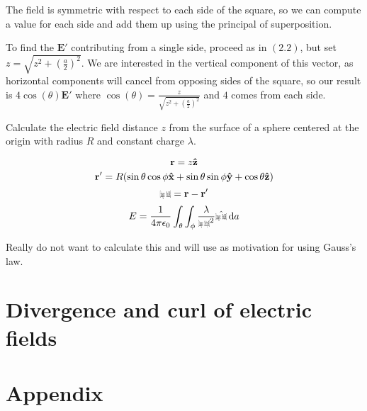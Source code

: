 \documentclass[10pt]{article}
\def\rcurs{{\mbox{$\resizebox{.16in}{.08in}{\texttt{[image: ScriptR]}}$}}}
\def\brcurs{{\mbox{$\resizebox{.16in}{.08in}{\texttt{[image: BoldR]}}$}}}
\def\hrcurs{{\mbox{$\hat \brcurs$}}}
\newcommand{\uvec}[1]{\boldsymbol{\hat{\textbf{#1}}}}
\begin{document}
\begin{solution}[2.4]

The field is symmetric with respect to each side of the square, so we can compute a value for each side and add them up using the principal of superposition.

To find the $\boldsymbol{E}'$ contributing from a single side, proceed as in $(2.2)$, but set $z = \sqrt{z^2 + (\frac a2)^2}$. We are interested in the vertical component of this vector, as horizontal components will cancel from opposing sides of the square, so our result is $4\cos(\theta)\boldsymbol{E}'$ where $\cos(\theta) = \frac{z}{\sqrt{z^2 + (\frac a2)^2}}$ and $4$ comes from each side.

\end{solution}

\begin{exercise}[2.7]
	Calculate the electric field distance $z$ from the surface of a sphere
	centered at the origin with radius $R$ and constant charge $\lambda$.
\end{exercise}

\begin{solution}
	\[ \bold{r} =  z\uvec{z}\]
	\[ \bold{r'} = R(\sin\theta\cos\phi\uvec{x} + \sin\theta\sin\phi\uvec{y} + \cos\theta\uvec{z}) \]
	\[ \brcurs = \bold{r} - \bold{r'} \]
	\[ E = \frac 1 {4\pi\epsilon_0} \int_\theta \int_\phi \frac \lambda {\rcurs^2} \hrcurs \dd a\]

	Really do not want to calculate this and will use as motivation for using
	Gauss's law.

\end{solution}

\section{Divergence and curl of electric fields}


\section{Appendix}
\end{document}
